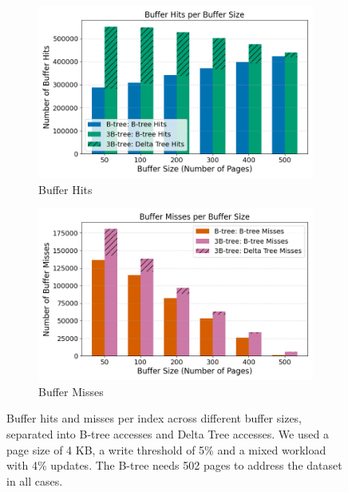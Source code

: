 \begin{figure}[htpb]
  \centering
  \begin{subfigure}[t]{0.49\textwidth}
    \centering
    \includegraphics[width=\textwidth]{figures/evaluation/buffer_hits_per_buffer_size.png}
    \caption{Buffer Hits}
  \end{subfigure}
  \hfill
  \begin{subfigure}[t]{0.49\textwidth}
    \centering
    \includegraphics[width=\textwidth]{figures/evaluation/buffer_misses_per_buffer_size.png}
    \caption{Buffer Misses}
  \end{subfigure}
  \caption{Buffer hits and misses per index across different buffer sizes, separated into B-tree accesses and Delta Tree accesses. We used a page size of 4 KB, a write threshold of 5\% and a mixed workload with 4\% updates. The B-tree needs 502 pages to address the dataset in all cases.}
  \label{fig:buffer-traffic}
\end{figure}


